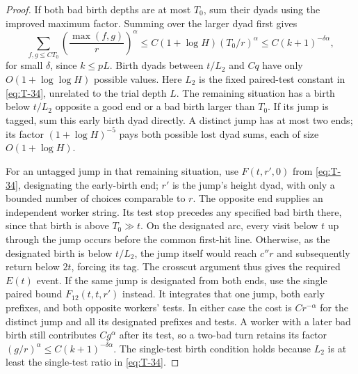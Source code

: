 \begin{proof}
If both bad birth depths are at most $T_0$, sum their dyads using the
improved maximum factor. Summing over the larger dyad first gives
\[
 \sum_{f,g\le CT_0}\left(\frac{\max(f,g)}r\right)^\alpha
 \le C(1+\log H)(T_0/r)^\alpha
 \le C(k+1)^{-\delta\alpha},
\]
for small $\delta$, since $k\le pL$. Birth dyads between $t/L_2$ and
$Cq$ have only $O(1+\log\log H)$ possible values. Here $L_2$ is the
fixed paired-test constant in \eqref{eq:T-34}, unrelated to the trial
depth $L$. The remaining situation has a birth below $t/L_2$ opposite
a good end or a bad birth larger than $T_0$. If its jump is tagged,
sum this early birth dyad directly. A distinct jump has at most two
ends; its factor $(1+\log H)^{-5}$ pays both possible lost dyad sums,
each of size $O(1+\log H)$.

For an untagged jump in that remaining situation, use
$F(t,r',0)$ from \eqref{eq:T-34}, designating the early-birth end;
$r'$ is the jump's height dyad, with only a bounded number of choices
comparable to $r$. The opposite end supplies an independent worker
string. Its test stop precedes any specified bad birth there, since
that birth is above $T_0\gg t$. On the designated arc, every visit
below $t$ up through the jump occurs before the common first-hit line.
Otherwise, as the designated birth is below $t/L_2$, the jump itself
would reach $c''r$ and subsequently return below $2t$, forcing its tag.
The crosscut argument thus gives the required $E(t)$ event. If the
same jump is designated from both ends, use the single paired bound
$F_{12}(t,t,r')$ instead. It integrates that one jump, both early
prefixes, and both opposite workers' tests. In either case the cost
is $Cr^{-\alpha}$ for the distinct jump and all its designated
prefixes and tests. A worker with a later bad birth still contributes
$Cg^\alpha$ after its test, so a two-bad turn retains its factor
$(g/r)^\alpha\le C(k+1)^{-\delta\alpha}$. The single-test birth
condition holds because $L_2$ is at least the single-test ratio in
\eqref{eq:T-34}.


\end{proof}
